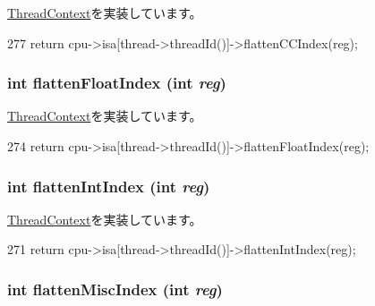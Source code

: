 \hyperlink{classThreadContext_aedffeaa2c4a155d5916a2ae379d77a51}{ThreadContext}を実装しています。


\begin{DoxyCode}
277     { return cpu->isa[thread->threadId()]->flattenCCIndex(reg); }
\end{DoxyCode}
\hypertarget{classInOrderThreadContext_ab9ea3f8f1a21df875c7273c7377dfac1}{
\subsubsection[{flattenFloatIndex}]{\setlength{\rightskip}{0pt plus 5cm}int flattenFloatIndex (int {\em reg})}}
\label{classInOrderThreadContext_ab9ea3f8f1a21df875c7273c7377dfac1}


\hyperlink{classThreadContext_a7176627444d21b2734a0855b67e6aacf}{ThreadContext}を実装しています。


\begin{DoxyCode}
274     { return cpu->isa[thread->threadId()]->flattenFloatIndex(reg); }
\end{DoxyCode}
\hypertarget{classInOrderThreadContext_aa529f2d70520c578e3e29b3bf1a66312}{
\subsubsection[{flattenIntIndex}]{\setlength{\rightskip}{0pt plus 5cm}int flattenIntIndex (int {\em reg})}}
\label{classInOrderThreadContext_aa529f2d70520c578e3e29b3bf1a66312}


\hyperlink{classThreadContext_a6940c379416884cb0b9eb04c5193580e}{ThreadContext}を実装しています。


\begin{DoxyCode}
271     { return cpu->isa[thread->threadId()]->flattenIntIndex(reg); }
\end{DoxyCode}
\hypertarget{classInOrderThreadContext_a5adc7d32f3a8bd75c5dc0a62d95564fd}{
\subsubsection[{flattenMiscIndex}]{\setlength{\rightskip}{0pt plus 5cm}int flattenMiscIndex (int {\em reg})}}
\label{classInOrderThreadContext_a5adc7d32f3a8bd75c5dc0a62d95564fd}


